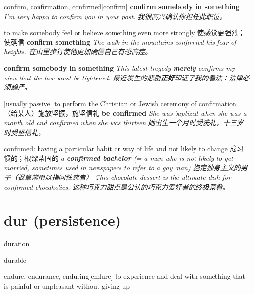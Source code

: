 \begin{DefWord}{confirm, confirmation, confirmed}[confirm]
    \textbf{confirm somebody in something} \textit{I'm very happy to confirm you in your post. 我很高兴确认你担任此职位。}

    to make somebody feel or believe something even more strongly 使感觉更强烈；使确信
    \textbf{confirm something} \textit{The walk in the mountains confirmed his fear of heights. 在山里步行使他更加确信自己有恐高症。}

    \textbf{confirm somebody in something} \textit{This latest tragedy \textbf{merely} confirms my view that the law must be tightened. 最近发生的悲剧\textbf{正好}印证了我的看法：法律必须趋严。}

    [usually passive] to perform the Christian or Jewish ceremony of confirmation （给某人）施放坚振，施坚信礼
    \textbf{be confirmed} \textit{ She was baptized when she was a month old and confirmed when she was thirteen.她出生一个月时受洗礼，十三岁时受坚信礼。}
        
    confirmed: having a particular habit or way of life and not likely to change 成习惯的；根深蒂固的
    \textit{a \textbf{confirmed bachelor} (= a man who is not likely to get married, sometimes used in newspapers to refer to a gay man) 抱定独身主义的男子（报章常用以指同性恋者）}
    \textit{This chocolate dessert is the ultimate dish for confirmed chocaholics. 这种巧克力甜点是公认的巧克力爱好者的终极菜肴。}


\end{DefWord}

\section{dur (persistence)}

\begin{DefWord}{duration}
\end{DefWord}

\begin{DefWord}{durable}
\end{DefWord}


\begin{DefWord}{endure, endurance, enduring}[endure]
    to experience and deal with something that is painful or unpleasant without giving up
\end{DefWord}
